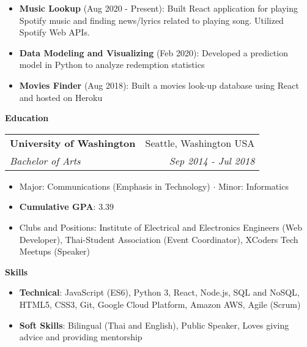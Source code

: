 \documentclass[10pt,a4paper]{article}
\makeatletter
\newcommand{\sectionheading}[1]{
  \vspace{12pt}
  \textbf{\Large #1}
  \vspace{6pt}
}
\newcommand{\subheadinginfo}[4]{
  \vspace{6pt}
  
  \begin{tabular*}{6.8in}{l@{\extracolsep{\fill}}r}
    \textbf{#1} & #2 \\
    \textit{#3} & \textit{#4} \\
  \end{tabular*}
  
  \vspace{-4pt}
}
\newcommand{\listitem}[1]{
  \item #1 \vspace{-5pt}
}
\makeatother
\begin{document}
\begin{itemize}
  \listitem{\textbf{Music Lookup} (Aug 2020 - Present): Built React application for playing
  Spotify music and finding news/lyrics related to playing song. Utilized Spotify Web APIs.}
\end{itemize}

\begin{itemize}
  \listitem{\textbf{Data Modeling and Visualizing} (Feb 2020): Developed a prediction model in Python
  to analyze redemption statistics}
\end{itemize}

\begin{itemize}
  \listitem{\textbf{Movies Finder} (Aug 2018): Built a movies look-up database using React and hosted on Heroku}
\end{itemize}

\sectionheading{Education}

\subheadinginfo
{University of Washington}
{Seattle, Washington USA}
{Bachelor of Arts}
{Sep 2014 - Jul 2018}

\begin{itemize}
  \listitem{Major: Communications (Emphasis in Technology) $\cdot$ Minor: Informatics}
  \listitem{\textbf{Cumulative GPA}: 3.39}
  \listitem{Clubs and Positions: Institute of Electrical and Electronics Engineers
  (Web Developer), Thai-Student Association (Event Coordinator), XCoders Tech Meetups (Speaker)}
\end{itemize}

\sectionheading{Skills}

\begin{itemize}
  \listitem{\textbf{Technical}: JavaScript (ES6), Python 3, React, Node.js, SQL and NoSQL,
  HTML5, CSS3, Git, Google Cloud Platform, Amazon AWS, Agile (Scrum)}
  \listitem{\textbf{Soft Skills}: Bilingual (Thai and English), Public Speaker, Loves giving advice and
  providing mentorship}
\end{itemize}
\end{document}
